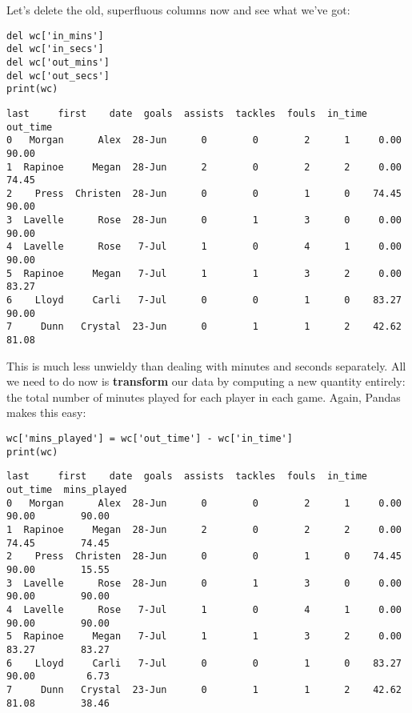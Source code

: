 Let's delete the old, superfluous columns now and see what we've got:

\begin{samepage}
\begin{Verbatim}[fontsize=\small,samepage=true,frame=single,framesep=3mm]
del wc['in_mins']
del wc['in_secs']
del wc['out_mins']
del wc['out_secs']
print(wc)
\end{Verbatim}
\vspace{-.2in}

\begin{Verbatim}[fontsize=\scriptsize,samepage=true,frame=leftline,framesep=5mm,framerule=1mm]
      last     first    date  goals  assists  tackles  fouls  in_time  out_time
0   Morgan      Alex  28-Jun      0        0        2      1     0.00     90.00
1  Rapinoe     Megan  28-Jun      2        0        2      2     0.00     74.45
2    Press  Christen  28-Jun      0        0        1      0    74.45     90.00
3  Lavelle      Rose  28-Jun      0        1        3      0     0.00     90.00
4  Lavelle      Rose   7-Jul      1        0        4      1     0.00     90.00
5  Rapinoe     Megan   7-Jul      1        1        3      2     0.00     83.27
6    Lloyd     Carli   7-Jul      0        0        1      0    83.27     90.00
7     Dunn   Crystal  23-Jun      0        1        1      2    42.62     81.08
\end{Verbatim}
\end{samepage}


This is much less unwieldy than dealing with minutes and seconds separately.
All we need to do now is \textbf{transform} our data by computing a new
quantity entirely: the {total number of minutes played} for each player in each
game. Again, Pandas makes this easy:

\begin{Verbatim}[fontsize=\small,samepage=true,frame=single,framesep=3mm]
wc['mins_played'] = wc['out_time'] - wc['in_time']
print(wc)
\end{Verbatim}
\vspace{-.2in}

\begin{Verbatim}[fontsize=\scriptsize,samepage=true,frame=leftline,framesep=5mm,framerule=1mm]
      last     first    date  goals  assists  tackles  fouls  in_time  out_time  mins_played
0   Morgan      Alex  28-Jun      0        0        2      1     0.00     90.00        90.00
1  Rapinoe     Megan  28-Jun      2        0        2      2     0.00     74.45        74.45
2    Press  Christen  28-Jun      0        0        1      0    74.45     90.00        15.55
3  Lavelle      Rose  28-Jun      0        1        3      0     0.00     90.00        90.00
4  Lavelle      Rose   7-Jul      1        0        4      1     0.00     90.00        90.00
5  Rapinoe     Megan   7-Jul      1        1        3      2     0.00     83.27        83.27
6    Lloyd     Carli   7-Jul      0        0        1      0    83.27     90.00         6.73
7     Dunn   Crystal  23-Jun      0        1        1      2    42.62     81.08        38.46
\end{Verbatim}

